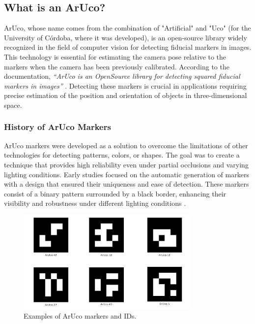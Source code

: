 \subsection{What is an ArUco?}
    ArUco, whose name comes from the combination of "Artificial" and "Uco" (for the University of Córdoba, where it was developed), is an open-source library widely recognized in the field of computer vision for detecting fiducial markers in images. This technology is essential for estimating the camera pose relative to the markers when the camera has been previously calibrated. According to the documentation, \textit{“ArUco is an OpenSource library for detecting squared fiducial markers in images”} \cite{aruco_docs}. Detecting these markers is crucial in applications requiring precise estimation of the position and orientation of objects in three-dimensional space.

    \subsubsection{History of ArUco Markers}

    ArUco markers were developed as a solution to overcome the limitations of other technologies for detecting patterns, colors, or shapes. The goal was to create a technique that provides high reliability even under partial occlusions and varying lighting conditions. Early studies focused on the automatic generation of markers with a design that ensured their uniqueness and ease of detection. These markers consist of a binary pattern surrounded by a black border, enhancing their visibility and robustness under different lighting conditions \cite{aruco_docs}.

    \begin{figure}[h!] 
        \centering 
        \includegraphics[width=0.8\textwidth]{pictures/arucos_ids.png} %
        \caption{Examples of ArUco markers and IDs.} 
        \label{fig} 
    \end{figure}

